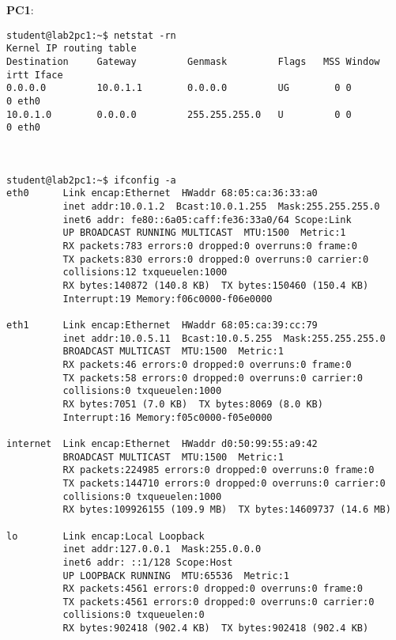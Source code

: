 \textbf{PC1}:
\begin{lstlisting}
student@lab2pc1:~$ netstat -rn
Kernel IP routing table
Destination     Gateway         Genmask         Flags   MSS Window  irtt Iface
0.0.0.0         10.0.1.1        0.0.0.0         UG        0 0          0 eth0
10.0.1.0        0.0.0.0         255.255.255.0   U         0 0          0 eth0



student@lab2pc1:~$ ifconfig -a
eth0      Link encap:Ethernet  HWaddr 68:05:ca:36:33:a0  
          inet addr:10.0.1.2  Bcast:10.0.1.255  Mask:255.255.255.0
          inet6 addr: fe80::6a05:caff:fe36:33a0/64 Scope:Link
          UP BROADCAST RUNNING MULTICAST  MTU:1500  Metric:1
          RX packets:783 errors:0 dropped:0 overruns:0 frame:0
          TX packets:830 errors:0 dropped:0 overruns:0 carrier:0
          collisions:12 txqueuelen:1000 
          RX bytes:140872 (140.8 KB)  TX bytes:150460 (150.4 KB)
          Interrupt:19 Memory:f06c0000-f06e0000 

eth1      Link encap:Ethernet  HWaddr 68:05:ca:39:cc:79  
          inet addr:10.0.5.11  Bcast:10.0.5.255  Mask:255.255.255.0
          BROADCAST MULTICAST  MTU:1500  Metric:1
          RX packets:46 errors:0 dropped:0 overruns:0 frame:0
          TX packets:58 errors:0 dropped:0 overruns:0 carrier:0
          collisions:0 txqueuelen:1000 
          RX bytes:7051 (7.0 KB)  TX bytes:8069 (8.0 KB)
          Interrupt:16 Memory:f05c0000-f05e0000 

internet  Link encap:Ethernet  HWaddr d0:50:99:55:a9:42  
          BROADCAST MULTICAST  MTU:1500  Metric:1
          RX packets:224985 errors:0 dropped:0 overruns:0 frame:0
          TX packets:144710 errors:0 dropped:0 overruns:0 carrier:0
          collisions:0 txqueuelen:1000 
          RX bytes:109926155 (109.9 MB)  TX bytes:14609737 (14.6 MB)

lo        Link encap:Local Loopback  
          inet addr:127.0.0.1  Mask:255.0.0.0
          inet6 addr: ::1/128 Scope:Host
          UP LOOPBACK RUNNING  MTU:65536  Metric:1
          RX packets:4561 errors:0 dropped:0 overruns:0 frame:0
          TX packets:4561 errors:0 dropped:0 overruns:0 carrier:0
          collisions:0 txqueuelen:0 
          RX bytes:902418 (902.4 KB)  TX bytes:902418 (902.4 KB)
\end{lstlisting}

